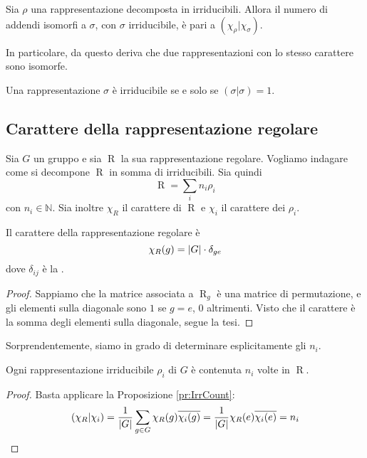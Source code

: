 \documentclass[a4paper,10pt,oneside]{math_article}
\newcommand{\herm}[2]{\left(#1 | #2\right)}
\DeclareMathOperator{\Reg}{R}
\let\conj\overline
\begin{document}
    \begin{myprop}\label{pr:IrrCount}
     Sia $\rho$ una rappresentazione decomposta in irriducibili. Allora il numero di addendi isomorfi a $\sigma$, con $\sigma$ irriducibile, è pari a $\herm{\chi_\rho}{\chi_\sigma}$.
    \end{myprop}

    In particolare, da questo deriva che due rappresentazioni con lo stesso carattere sono isomorfe.
    
    \begin{mytheorem}
     Una rappresentazione $\sigma$ è irriducibile se e solo se $\herm\sigma\sigma=1$.
    \end{mytheorem}

   \subsection{Carattere della rappresentazione regolare}
    Sia $G$ un gruppo e sia $\Reg$ la sua rappresentazione regolare. Vogliamo indagare come si decompone $\Reg$ in somma di irriducibili. Sia quindi
    \[
     \Reg = \sum_i n_i \rho_i
    \]
    con $n_i \in \mathbb N$. Sia inoltre $\chi_R$ il carattere di $\Reg$ e $\chi_i$ il carattere dei $\rho_i$.
      
    \begin{myprop}
     Il carattere della rappresentazione regolare è
      \[
      \chi_R(g) = \left|G\right| \cdot \delta_{ge}
      \]
     dove $\delta_{ij}$ è la .
    \end{myprop}
    
    \begin{proof}
      Sappiamo che la matrice associata a $\Reg_g$ è una matrice di permutazione, e gli elementi sulla diagonale sono $1$ se $g=e$, $0$ altrimenti. Visto che il carattere è la somma degli elementi sulla diagonale, segue la tesi.
    \end{proof}
    
 
    
    Sorprendentemente, siamo in grado di determinare esplicitamente gli $n_i$.
    \begin{myprop}
     Ogni rappresentazione irriducibile $\rho_i$ di $G$ è contenuta $n_i$ volte in $\Reg$.
    \end{myprop}
    
    \begin{proof}
     Basta applicare la Proposizione \ref{pr:IrrCount}:
     \[
      \herm{\chi_R}{\chi_i} = \frac1{\abs G}\sum_{g\in G} \chi_R(g)\conj{\chi_i(g)} = \frac1{\abs G}\chi_R(e)\conj{\chi_i(e)} = n_i
     \]

    \end{proof}
\end{document}
